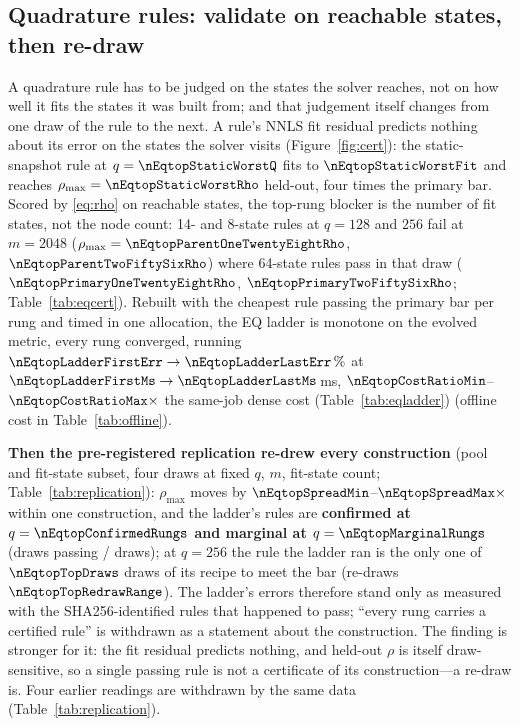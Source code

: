 \subsection{Quadrature rules: validate on reachable states, then re-draw}
\label{sec:exp:eq}

A quadrature rule has to be judged on the states the solver reaches, not on how
well it fits the states it was built from; and that judgement itself changes
from one draw of the rule to the next. A rule's NNLS fit residual predicts
nothing about its error on the states the solver visits
(Figure~\ref{fig:cert}): the static-snapshot rule at
$q=\nEqtopStaticWorstQ$ fits to $\nEqtopStaticWorstFit$ and reaches
$\rho_{\max}=\nEqtopStaticWorstRho$ held-out, four times the primary bar. Scored by \eqref{eq:rho} on reachable states, the top-rung blocker is the
number of fit states, not the node count: 14- and 8-state rules at $q=128$ and
$256$ fail at $m=2048$ ($\rho_{\max}=\nEqtopParentOneTwentyEightRho$,
$\nEqtopParentTwoFiftySixRho$) where 64-state rules pass in that draw
($\nEqtopPrimaryOneTwentyEightRho$, $\nEqtopPrimaryTwoFiftySixRho$;
Table~\ref{tab:eqcert}). Rebuilt with the cheapest rule passing the primary
bar per rung and timed in one allocation, the EQ ladder is monotone on the
evolved metric, every rung converged, running
$\nEqtopLadderFirstErr\to\nEqtopLadderLastErr\,\%$ at
$\nEqtopLadderFirstMs\to\nEqtopLadderLastMs$\,ms, $\nEqtopCostRatioMin$--$\nEqtopCostRatioMax\times$
the same-job dense cost (Table~\ref{tab:eqladder}) (offline cost in Table~\ref{tab:offline}).

\textbf{Then the pre-registered replication re-drew every construction}
(pool and fit-state subset, four draws at fixed $q$, $m$, fit-state count;
Table~\ref{tab:replication}): $\rho_{\max}$ moves by
$\nEqtopSpreadMin$--$\nEqtopSpreadMax\times$ within one construction, and the
ladder's rules are \textbf{confirmed at $q=\nEqtopConfirmedRungs$ and marginal
at $q=\nEqtopMarginalRungs$} (draws passing / draws); at $q=256$ the rule the
ladder ran is the only one of $\nEqtopTopDraws$ draws of its recipe to meet
the bar (re-draws $\nEqtopTopRedrawRange$). The ladder's errors therefore stand
only as measured with the SHA256-identified rules that happened to pass;
``every rung carries a certified rule'' is withdrawn as a statement about the
construction. The finding is stronger for it: the fit residual predicts
nothing, and held-out $\rho$ is itself draw-sensitive, so a single passing rule
is not a certificate of its construction---a re-draw is. Four earlier readings
are withdrawn by the same data (Table~\ref{tab:replication}).

